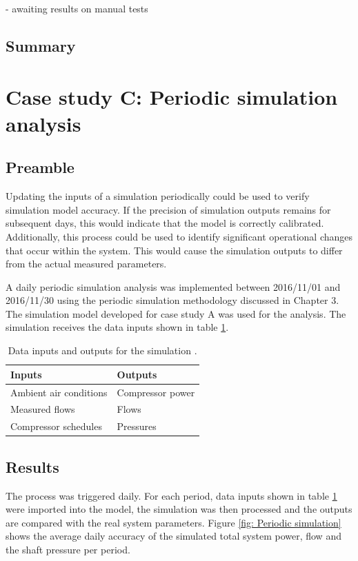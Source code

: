 	- awaiting results on manual tests
	
	\subsection{Summary}
\newpage
\section{Case study C: Periodic simulation analysis}
	\subsection{Preamble}
	Updating the inputs of a simulation periodically could be used to verify simulation model accuracy. If the precision of simulation outputs remains for subsequent days, this would indicate that the model is correctly calibrated. Additionally, this process could be used to identify significant operational changes that occur within the system. This would cause the simulation outputs to differ from the actual measured parameters. 
	\par 
	A daily periodic simulation  analysis was implemented between 2016/11/01 and 2016/11/30 using the periodic simulation methodology discussed in Chapter 3. The simulation model developed for case study A was used for the analysis. The simulation receives the data inputs shown in table \ref{table: Periodic inputs/outputs}.
	\begin{table}[h]
		\centering
		\begin{tabular}{ll}
			\hline
			Inputs \hspace*{4cm}    &Outputs \hspace*{4cm}    \\  \hline
			Ambient air conditions&Compressor power \\
			Measured flows& Flows \\
			Compressor schedules& Pressures \\
			\hline
		\end{tabular}
		\caption{Data inputs and outputs for the simulation .}
		\label{table: Periodic inputs/outputs}
	\end{table}

\subsection{Results}


 The process was triggered daily. For each period, data inputs shown in table \ref{table: Periodic inputs/outputs} were imported into the model, the simulation was then processed and the outputs are compared with the real system parameters. Figure \ref{fig: Periodic simulation} shows the average daily accuracy of the simulated total system power, flow and the shaft pressure per period.
	     \par 
     
